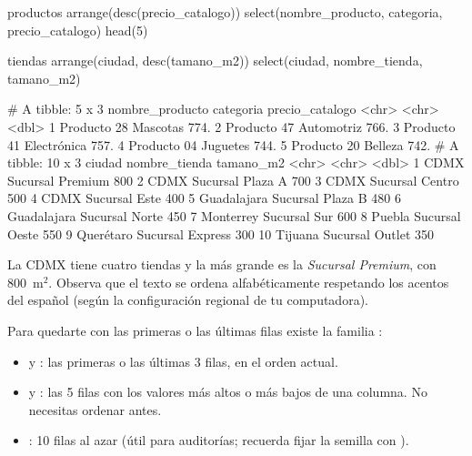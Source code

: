 \begin{rcode}
productos %
  arrange(desc(precio_catalogo)) %
  select(nombre_producto, categoria, precio_catalogo) %
  head(5)

tiendas %
  arrange(ciudad, desc(tamano_m2)) %
  select(ciudad, nombre_tienda, tamano_m2)
\end{rcode}
\begin{rsalida}
# A tibble: 5 x 3
  nombre_producto categoria   precio_catalogo
  <chr>           <chr>                 <dbl>
1 Producto 28     Mascotas               774.
2 Producto 47     Automotriz             766.
3 Producto 41     Electrónica            757.
4 Producto 04     Juguetes               744.
5 Producto 20     Belleza                742.
# A tibble: 10 x 3
   ciudad      nombre_tienda    tamano_m2
   <chr>       <chr>                <dbl>
 1 CDMX        Sucursal Premium       800
 2 CDMX        Sucursal Plaza A       700
 3 CDMX        Sucursal Centro        500
 4 CDMX        Sucursal Este          400
 5 Guadalajara Sucursal Plaza B       480
 6 Guadalajara Sucursal Norte         450
 7 Monterrey   Sucursal Sur           600
 8 Puebla      Sucursal Oeste         550
 9 Querétaro   Sucursal Express       300
10 Tijuana     Sucursal Outlet        350
\end{rsalida}

La CDMX tiene cuatro tiendas y la más grande es la \emph{Sucursal Premium},
con 800~m$^2$. Observa que el texto se ordena alfabéticamente respetando los
acentos del español (según la configuración regional de tu computadora).

Para quedarte con las primeras o las últimas filas existe la familia
:

\begin{itemize}
  \item {} y : las
        primeras o las últimas 3 filas, en el orden actual.
  \item {} y
        : las 5 filas con los valores más
        altos o más bajos de una columna. No necesitas ordenar antes.
  \item {}: 10 filas al azar (útil para
        auditorías; recuerda fijar la semilla con ).
\end{itemize}

